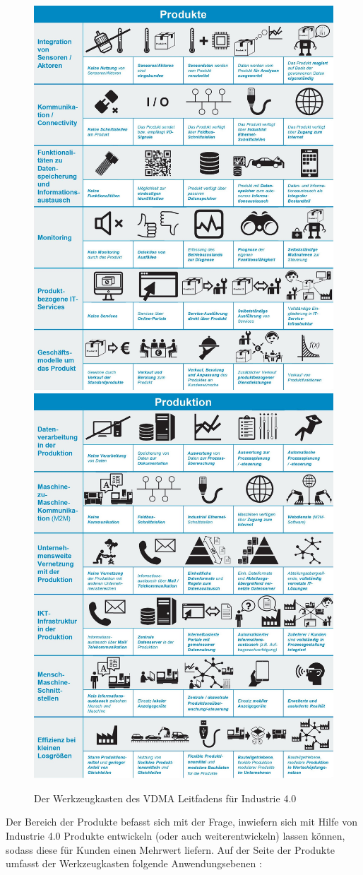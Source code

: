 \begin{figure}[h]
	\includegraphics[width=0.5\linewidth]{Bilder/A6_VDMAWerkzeugkasten1}
	\includegraphics[width=0.499\linewidth]{Bilder/A7_VDMAWerkzeugkasten2}
	\caption{Der Werkzeugkasten des VDMA Leitfadens für Industrie 4.0 \cite[S.9]{2}}
	\label{fig:VDMAWerkzeugkasten}
\end{figure}
\newline
\noindent Der Bereich der Produkte befasst sich mit der Frage, inwiefern sich mit Hilfe von Industrie 4.0 Produkte entwickeln (oder auch weiterentwickeln) lassen können, sodass diese für Kunden einen Mehrwert liefern. Auf der Seite der Produkte umfasst der Werkzeugkasten folgende Anwendungsebenen \cite[S.13]{2}:

